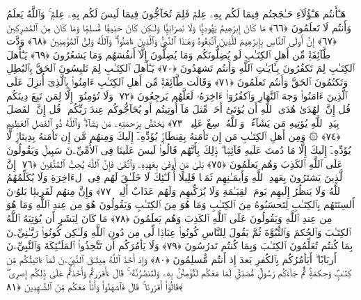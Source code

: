  هَـٰٓأَنتُم هَـٰٓؤُلَآءِ حَـٰجَجتُم فِيمَا لَكُم بِهِۦ عِلمٌۭ فَلِمَ تُحَآجُّونَ فِيمَا لَيسَ لَكُم بِهِۦ عِلمٌۭ ۚ وَٱللَّهُ يَعلَمُ وَأَنتُم لَا تَعلَمُونَ ﴿٦٦﴾
 مَا كَانَ إِبرَٰهِيمُ يَهُودِيًّۭا وَلَا نَصرَانِيًّۭا وَلَـٰكِن كَانَ حَنِيفًۭا مُّسلِمًۭا وَمَا كَانَ مِنَ ٱلمُشرِكِينَ ﴿٦٧﴾
 إِنَّ أَولَى ٱلنَّاسِ بِإِبرَٰهِيمَ لَلَّذِينَ ٱتَّبَعُوهُ وَهَـٰذَا ٱلنَّبِىُّ وَٱلَّذِينَ ءَامَنُوا۟ ۗ وَٱللَّهُ وَلِىُّ ٱلمُؤمِنِينَ ﴿٦٨﴾
 وَدَّت طَّآئِفَةٌۭ مِّن أَهلِ ٱلكِتَـٰبِ لَو يُضِلُّونَكُم وَمَا يُضِلُّونَ إِلَّآ أَنفُسَهُم وَمَا يَشعُرُونَ ﴿٦٩﴾
 يَـٰٓأَهلَ ٱلكِتَـٰبِ لِمَ تَكفُرُونَ بِـَٔايَـٰتِ ٱللَّهِ وَأَنتُم تَشهَدُونَ ﴿٧٠﴾
 يَـٰٓأَهلَ ٱلكِتَـٰبِ لِمَ تَلبِسُونَ ٱلحَقَّ بِٱلبَٰطِلِ وَتَكتُمُونَ ٱلحَقَّ وَأَنتُم تَعلَمُونَ ﴿٧١﴾
 وَقَالَت طَّآئِفَةٌۭ مِّن أَهلِ ٱلكِتَـٰبِ ءَامِنُوا۟ بِٱلَّذِىٓ أُنزِلَ عَلَى ٱلَّذِينَ ءَامَنُوا۟ وَجهَ ٱلنَّهَارِ وَٱكفُرُوٓا۟ ءَاخِرَهُۥ لَعَلَّهُم يَرجِعُونَ ﴿٧٢﴾
 وَلَا تُؤمِنُوٓا۟ إِلَّا لِمَن تَبِعَ دِينَكُم قُل إِنَّ ٱلهُدَىٰ هُدَى ٱللَّهِ أَن يُؤتَىٰٓ أَحَدٌۭ مِّثلَ مَآ أُوتِيتُم أَو يُحَآجُّوكُم عِندَ رَبِّكُم ۗ قُل إِنَّ ٱلفَضلَ بِيَدِ ٱللَّهِ يُؤتِيهِ مَن يَشَآءُ ۗ وَٱللَّهُ وَٟسِعٌ عَلِيمٌۭ ﴿٧٣﴾
 يَختَصُّ بِرَحمَتِهِۦ مَن يَشَآءُ ۗ وَٱللَّهُ ذُو ٱلفَضلِ ٱلعَظِيمِ ﴿٧٤﴾
 ۞ وَمِن أَهلِ ٱلكِتَـٰبِ مَن إِن تَأمَنهُ بِقِنطَارٍۢ يُؤَدِّهِۦٓ إِلَيكَ وَمِنهُم مَّن إِن تَأمَنهُ بِدِينَارٍۢ لَّا يُؤَدِّهِۦٓ إِلَيكَ إِلَّا مَا دُمتَ عَلَيهِ قَآئِمًۭا ۗ ذَٟلِكَ بِأَنَّهُم قَالُوا۟ لَيسَ عَلَينَا فِى ٱلأُمِّيِّۦنَ سَبِيلٌۭ وَيَقُولُونَ عَلَى ٱللَّهِ ٱلكَذِبَ وَهُم يَعلَمُونَ ﴿٧٥﴾
 بَلَىٰ مَن أَوفَىٰ بِعَهدِهِۦ وَٱتَّقَىٰ فَإِنَّ ٱللَّهَ يُحِبُّ ٱلمُتَّقِينَ ﴿٧٦﴾
 إِنَّ ٱلَّذِينَ يَشتَرُونَ بِعَهدِ ٱللَّهِ وَأَيمَـٰنِهِم ثَمَنًۭا قَلِيلًا أُو۟لَـٰٓئِكَ لَا خَلَـٰقَ لَهُم فِى ٱلءَاخِرَةِ وَلَا يُكَلِّمُهُمُ ٱللَّهُ وَلَا يَنظُرُ إِلَيهِم يَومَ ٱلقِيَـٰمَةِ وَلَا يُزَكِّيهِم وَلَهُم عَذَابٌ أَلِيمٌۭ ﴿٧٧﴾
 وَإِنَّ مِنهُم لَفَرِيقًۭا يَلوُۥنَ أَلسِنَتَهُم بِٱلكِتَـٰبِ لِتَحسَبُوهُ مِنَ ٱلكِتَـٰبِ وَمَا هُوَ مِنَ ٱلكِتَـٰبِ وَيَقُولُونَ هُوَ مِن عِندِ ٱللَّهِ وَمَا هُوَ مِن عِندِ ٱللَّهِ وَيَقُولُونَ عَلَى ٱللَّهِ ٱلكَذِبَ وَهُم يَعلَمُونَ ﴿٧٨﴾
 مَا كَانَ لِبَشَرٍ أَن يُؤتِيَهُ ٱللَّهُ ٱلكِتَـٰبَ وَٱلحُكمَ وَٱلنُّبُوَّةَ ثُمَّ يَقُولَ لِلنَّاسِ كُونُوا۟ عِبَادًۭا لِّى مِن دُونِ ٱللَّهِ وَلَـٰكِن كُونُوا۟ رَبَّـٰنِيِّۦنَ بِمَا كُنتُم تُعَلِّمُونَ ٱلكِتَـٰبَ وَبِمَا كُنتُم تَدرُسُونَ ﴿٧٩﴾
 وَلَا يَأمُرَكُم أَن تَتَّخِذُوا۟ ٱلمَلَـٰٓئِكَةَ وَٱلنَّبِيِّۦنَ أَربَابًا ۗ أَيَأمُرُكُم بِٱلكُفرِ بَعدَ إِذ أَنتُم مُّسلِمُونَ ﴿٨٠﴾
 وَإِذ أَخَذَ ٱللَّهُ مِيثَـٰقَ ٱلنَّبِيِّۦنَ لَمَآ ءَاتَيتُكُم مِّن كِتَـٰبٍۢ وَحِكمَةٍۢ ثُمَّ جَآءَكُم رَسُولٌۭ مُّصَدِّقٌۭ لِّمَا مَعَكُم لَتُؤمِنُنَّ بِهِۦ وَلَتَنصُرُنَّهُۥ ۚ قَالَ ءَأَقرَرتُم وَأَخَذتُم عَلَىٰ ذَٟلِكُم إِصرِى ۖ قَالُوٓا۟ أَقرَرنَا ۚ قَالَ فَٱشهَدُوا۟ وَأَنَا۠ مَعَكُم مِّنَ ٱلشَّـٰهِدِينَ ﴿٨١﴾
